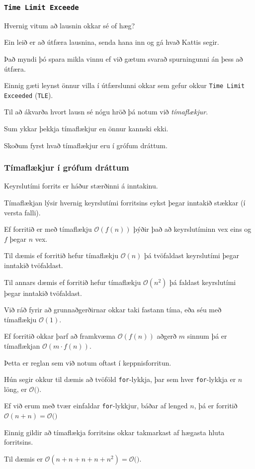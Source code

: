 {
	\frametitle{\texttt{Time Limit Exceede}}
	{
		\item<1-> Hvernig vitum að lausnin okkar sé of hæg?
		\item<2-> Ein leið er að útfæra lausnina, senda hana inn og gá hvað Kattis segir.
		\item<3-> Það myndi þó spara mikla vinnu ef við gætum svarað spurningunni án þess að útfæra.
		\item<4-> Einnig gæti leynst önnur villa í útfærslunni okkar sem gefur okkur \texttt{Time Limit Exceeded} (\texttt{TLE}).
		\item<5-> Til að ákvarða hvort lausn sé nógu hröð þá notum við \emph{tímaflækjur}.
		\item<6-> Sum ykkar þekkja tímaflækjur en önnur kannski ekki.
		\item<7-> Skoðum fyrst hvað tímaflækjur eru í grófum dráttum.
	}
}

{
	\frametitle{Tímaflækjur í grófum dráttum}
	{
		\item<1-> Keyrslutími forrits er háður stærðinni á inntakinu.
		\item<2-> Tímaflækjan lýsir hvernig keyrslutími forritsins eykst þegar inntakið stækkar (í versta falli).
		\item<3-> Ef forritið er með tímaflækju $\mathcal{O}(f(n))$ þýðir það að keyrslutíminn vex eins og $f$ þegar $n$ vex.
		\item<4-> Til dæmis ef forritið hefur tímaflækju $\mathcal{O}(n)$ þá tvöfaldast keyrslutími þegar inntakið tvöfaldast.
		\item<5-> Til annars dæmis ef forritið hefur tímaflækju $\mathcal{O}(n^2)$ þá faldast keyrslutími þegar inntakið tvöfaldast.
		\item<7-> Við ráð fyrir að grunnaðgerðirnar okkar taki fastann tíma, eða séu með tímaflækju $\mathcal{O}(1)$.
	}
}

{
	{
		\item<1-> Ef forritið okkar þarf að framkvæma $\mathcal{O}(f(n))$ aðgerð $m$ sinnum þá er tímaflækjan $\mathcal{O}(m \cdot f(n))$.
		\item<2-> Þetta er reglan sem við notum oftast í keppnisforritun.
		\item<3-> Hún segir okkur til dæmis að tvöföld \texttt{for}-lykkja, þar sem hver \texttt{for}-lykkja er $n$ löng, er
			$\mathcal{O}($\onslide<4->{$n^2$}$)$.
		\item<5-> Ef við erum með tvær einfaldar \texttt{for}-lykkjur, báðar af lenged $n$, þá er forritið 
			$\mathcal{O}(n + n) = \mathcal{O}($\onslide<6->{$n$}$)$
		\item<7-> Einnig gildir að tímaflækja forritsins okkar takmarkast af hægasta hluta forritsins.
		\item<8-> Til dæmis er
			$\mathcal{O}(n + n + n + n + n^2) = \mathcal{O}($\onslide<9->{$n^2$}$)$.
	}
}

